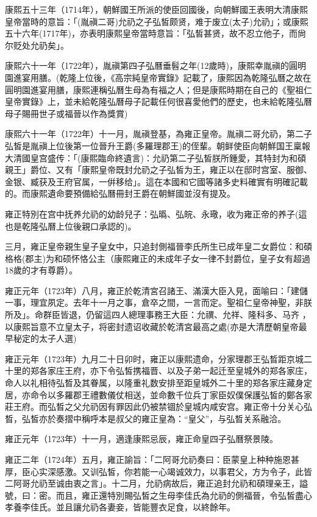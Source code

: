 康熙五十三年（1714年），朝鮮國王所派的使臣回國後，向朝鮮國王表明大清康熙皇帝當時的意旨：「(胤禛二哥)允礽之子弘皙颇贤，难于废立(太子)允礽」；或康熙五十六年(1717年)，亦表明康熙皇帝當時意旨：「弘皙甚贤，故不忍立他子，而尙尔贬处允礽矣」。

康熙六十一年（1722年），胤禛第四子弘曆垂髫之年(12歲時)，康熙幸胤禛的圓明園進宴用膳。(乾隆上位後，《高宗純皇帝實錄》記載了，康熙因為乾隆弘曆之故在圓明園進宴用膳，康熙連稱弘曆生母為有福之人；但是康熙時期在自己的《聖祖仁皇帝實錄》上，並未給乾隆弘曆母子記載任何很喜愛他們的歷史，也未給乾隆弘曆母子賜冊世子或福晉以作為獎賞)

康熙六十一年（1722年）十一月，胤禛登基，為雍正皇帝。胤禛二哥允礽，第二子弘皙是胤禛上位後第一位晉升王爵(多羅理郡王)的侄輩。朝鲜使臣向朝鮮国王稟報大清國皇宫盛传：「(康熙臨命終遺言)：允礽第二子弘皙朕所鍾愛，其特封为和碩親王」爵位、又有「康熙皇帝既封允礽之子弘皙为王，雍正以在邸时宫室、服御、金银、臧获及王府官属，一倂移给」。這在本國和它國等諸多史料確實有明確記載的。而康熙遺命要預備給弘曆冊封王爵在朝鮮國並沒有提及。

雍正特別在宫中抚养允礽的幼龄兒子：弘㬙、弘皖、永璥，收为雍正帝的养子(這也是乾隆弘曆上位後親口承認的)。

三月，雍正皇帝親生皇子皇女中，只追封側福晉李氏所生已成年皇二女爵位：和碩格格(郡主)为和硕怀恪公主（康熙雍正的未成年子女一律不封爵位，皇子女有超過18歲的才有尊爵）。

雍正元年（1723年）八月，雍正於乾清宮召諸王、滿漢大臣入見，面喻曰：「建儲一事，理宜夙定。去年十一月之事，倉卒之間，一言而定。聖祖仁皇帝神聖，非朕所及」。命群臣皆退，仍留這四人總理事務王大臣：允禩、允祥、隆科多、马齐 ，以康熙旨意不立皇太子，将密封遗诏收藏於乾清宮最高之處(亦是大清歷朝皇帝最早秘定的太子人選)

雍正元年（1723年）九月二十日卯时，雍正以康熙遗命，分家理郡王弘晳距京城二十里的郑各家庄王府，亦下令弘皙携福晋、以及子弟一起迁至皇城外的郑各家庄，命人以礼相待弘晳及其眷属，以隆重礼数安排至距皇城外二十里的郑各家庄藏身定居，亦命令以多羅郡王禮數儀仗相送，並命數千位兵丁家臣奴僕保護弘皙的鄭各家莊王府。而弘晳之父允礽因有罪因此仍被禁锢於皇城内咸安宫。雍正帝十分关心弘晳，弘皙亦於奏摺中稱呼本是叔父的雍正皇為：“皇父”，与弘晳关系融洽。

雍正元年（1723年）十一月，適逢康熙忌辰，雍正命皇四子弘曆祭景陵。

雍正二年（1724年）五月，雍正諭旨：「二阿哥允礽奏曰：臣蒙皇上种种施恩甚厚，臣心实深感激。又训弘皙，你若能一心竭诚效力，以事君父，方为令子，此皆二阿哥允礽至诚由衷之言」。十二月，允礽病故后，雍正追封允礽和碩理亲王，謚號，曰：密。而且，雍正還特別賜弘皙之生母李佳氏為允礽的側福晉，令弘皙盡心孝養李佳氏。並且讓允礽各妻妾，皆能豐衣足食，以終餘年。

